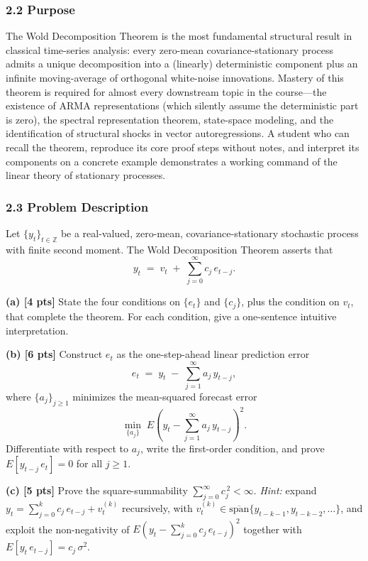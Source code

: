 \documentclass[11pt]{article}
\begin{document}
\subsubsection*{2.2 Purpose}
The Wold Decomposition Theorem is the most fundamental structural result in classical time-series analysis: every zero-mean covariance-stationary process admits a unique decomposition into a (linearly) deterministic component plus an infinite moving-average of orthogonal white-noise innovations. Mastery of this theorem is required for almost every downstream topic in the course---the existence of ARMA representations (which silently assume the deterministic part is zero), the spectral representation theorem, state-space modeling, and the identification of structural shocks in vector autoregressions. A student who can recall the theorem, reproduce its core proof steps without notes, and interpret its components on a concrete example demonstrates a working command of the linear theory of stationary processes.

\subsubsection*{2.3 Problem Description}
Let $\{y_t\}_{t\in\mathbb{Z}}$ be a real-valued, zero-mean, covariance-stationary stochastic process with finite second moment. The Wold Decomposition Theorem asserts that
\[
y_t \;=\; v_t \;+\; \sum_{j=0}^{\infty} c_j\, e_{t-j}.
\]

\textbf{(a) [4 pts]} State the four conditions on $\{e_t\}$ and $\{c_j\}$, plus the condition on $v_t$, that complete the theorem. For each condition, give a one-sentence intuitive interpretation.

\textbf{(b) [6 pts]} Construct $e_t$ as the one-step-ahead linear prediction error
\[
e_t \;=\; y_t \;-\; \sum_{j=1}^{\infty} a_j\, y_{t-j},
\]
where $\{a_j\}_{j\geq 1}$ minimizes the mean-squared forecast error
\[
\min_{\{a_j\}}\; E\!\left(y_t - \sum_{j=1}^{\infty} a_j\, y_{t-j}\right)^{\!2}.
\]
Differentiate with respect to $a_j$, write the first-order condition, and prove $E[y_{t-j}\, e_t] = 0$ for all $j \geq 1$.

\textbf{(c) [5 pts]} Prove the square-summability $\sum_{j=0}^{\infty} c_j^{\,2} < \infty$. \emph{Hint:} expand $y_t = \sum_{j=0}^{k} c_j\, e_{t-j} + v_t^{(k)}$ recursively, with $v_t^{(k)} \in \overline{\mathrm{span}}\{y_{t-k-1},y_{t-k-2},\ldots\}$, and exploit the non-negativity of $E\!\left(y_t - \sum_{j=0}^{k} c_j\, e_{t-j}\right)^{2}$ together with $E[y_t\, e_{t-j}] = c_j\, \sigma^2$.
\end{document}
